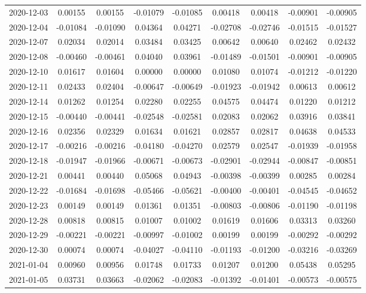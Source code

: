 {\begin{footnotesize}
\begin{longtable}{lcccccccc}
2020-12-03 & 0.00155 & 0.00155 & -0.01079 & -0.01085 & 0.00418 & 0.00418 & -0.00901 & -0.00905 \\
2020-12-04 & -0.01084 & -0.01090 & 0.04364 & 0.04271 & -0.02708 & -0.02746 & -0.01515 & -0.01527 \\
2020-12-07 & 0.02034 & 0.02014 & 0.03484 & 0.03425 & 0.00642 & 0.00640 & 0.02462 & 0.02432 \\
2020-12-08 & -0.00460 & -0.00461 & 0.04040 & 0.03961 & -0.01489 & -0.01501 & -0.00901 & -0.00905 \\
2020-12-10 & 0.01617 & 0.01604 & 0.00000 & 0.00000 & 0.01080 & 0.01074 & -0.01212 & -0.01220 \\
2020-12-11 & 0.02433 & 0.02404 & -0.00647 & -0.00649 & -0.01923 & -0.01942 & 0.00613 & 0.00612 \\
2020-12-14 & 0.01262 & 0.01254 & 0.02280 & 0.02255 & 0.04575 & 0.04474 & 0.01220 & 0.01212 \\
2020-12-15 & -0.00440 & -0.00441 & -0.02548 & -0.02581 & 0.02083 & 0.02062 & 0.03916 & 0.03841 \\
2020-12-16 & 0.02356 & 0.02329 & 0.01634 & 0.01621 & 0.02857 & 0.02817 & 0.04638 & 0.04533 \\
2020-12-17 & -0.00216 & -0.00216 & -0.04180 & -0.04270 & 0.02579 & 0.02547 & -0.01939 & -0.01958 \\
2020-12-18 & -0.01947 & -0.01966 & -0.00671 & -0.00673 & -0.02901 & -0.02944 & -0.00847 & -0.00851 \\
2020-12-21 & 0.00441 & 0.00440 & 0.05068 & 0.04943 & -0.00398 & -0.00399 & 0.00285 & 0.00284 \\
2020-12-22 & -0.01684 & -0.01698 & -0.05466 & -0.05621 & -0.00400 & -0.00401 & -0.04545 & -0.04652 \\
2020-12-23 & 0.00149 & 0.00149 & 0.01361 & 0.01351 & -0.00803 & -0.00806 & -0.01190 & -0.01198 \\
2020-12-28 & 0.00818 & 0.00815 & 0.01007 & 0.01002 & 0.01619 & 0.01606 & 0.03313 & 0.03260 \\
2020-12-29 & -0.00221 & -0.00221 & -0.00997 & -0.01002 & 0.00199 & 0.00199 & -0.00292 & -0.00292 \\
2020-12-30 & 0.00074 & 0.00074 & -0.04027 & -0.04110 & -0.01193 & -0.01200 & -0.03216 & -0.03269 \\
2021-01-04 & 0.00960 & 0.00956 & 0.01748 & 0.01733 & 0.01207 & 0.01200 & 0.05438 & 0.05295 \\
2021-01-05 & 0.03731 & 0.03663 & -0.02062 & -0.02083 & -0.01392 & -0.01401 & -0.00573 & -0.00575 \\

\end{longtable}
\end{footnotesize}}
